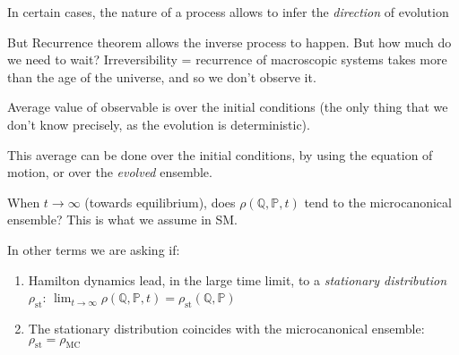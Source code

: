 \documentclass[../template.tex]{subfiles}
\begin{document}
In certain cases, the nature of a process allows to infer the \textit{direction} of evolution  %

But Recurrence theorem allows the inverse process to happen. But how much do we need to wait? Irreversibility = recurrence of macroscopic systems takes more than the age of the universe, and so we don't observe it.

Average value of observable is over the initial conditions (the only thing that we don't know precisely, as the evolution is deterministic). %

This average can be done over the initial conditions, by using the equation of motion, or over the \textit{evolved} ensemble.

When $t \to \infty$ (towards equilibrium), does $\rho(\mathbb{Q},\mathbb{P},t)$ tend to the microcanonical ensemble? This is what we assume in SM. 


In other terms we are asking if:
\begin{enumerate}
    \item Hamilton dynamics lead, in the large time limit, to a \textit{stationary distribution} $\rho_{\mathrm{st}}$: 
    $\displaystyle \lim_{t \to \infty} \rho(\mathbb{Q}, \mathbb{P}, t) = \rho_{\mathrm{st}}(\mathbb{Q}, \mathbb{P})$
    \item The stationary distribution coincides with the microcanonical ensemble: $\rho_{\mathrm{st}} = \rho_{\mathrm{MC}}$ %
\end{enumerate}
\end{document}
